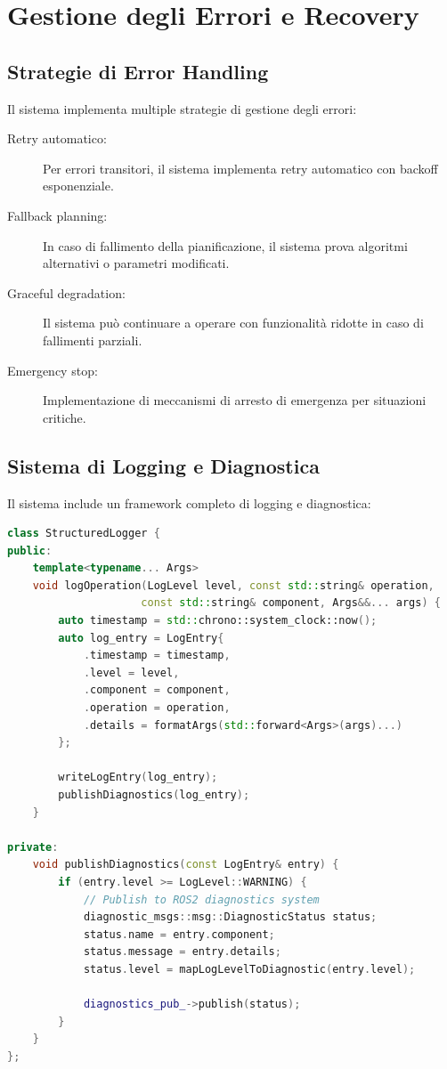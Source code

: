 \documentclass[12pt,a4paper,twoside,openright]{book}
\begin{document}
\section{Gestione degli Errori e Recovery}

\subsection{Strategie di Error Handling}

Il sistema implementa multiple strategie di gestione degli errori:

\begin{description}
    \item[Retry automatico:] Per errori transitori, il sistema implementa retry automatico con backoff esponenziale.
    
    \item[Fallback planning:] In caso di fallimento della pianificazione, il sistema prova algoritmi alternativi o parametri modificati.
    
    \item[Graceful degradation:] Il sistema può continuare a operare con funzionalità ridotte in caso di fallimenti parziali.
    
    \item[Emergency stop:] Implementazione di meccanismi di arresto di emergenza per situazioni critiche.
\end{description}

\subsection{Sistema di Logging e Diagnostica}

Il sistema include un framework completo di logging e diagnostica:

\begin{lstlisting}[language=C++, caption={Sistema di logging strutturato}]
class StructuredLogger {
public:
    template<typename... Args>
    void logOperation(LogLevel level, const std::string& operation, 
                     const std::string& component, Args&&... args) {
        auto timestamp = std::chrono::system_clock::now();
        auto log_entry = LogEntry{
            .timestamp = timestamp,
            .level = level,
            .component = component,
            .operation = operation,
            .details = formatArgs(std::forward<Args>(args)...)
        };
        
        writeLogEntry(log_entry);
        publishDiagnostics(log_entry);
    }
    
private:
    void publishDiagnostics(const LogEntry& entry) {
        if (entry.level >= LogLevel::WARNING) {
            // Publish to ROS2 diagnostics system
            diagnostic_msgs::msg::DiagnosticStatus status;
            status.name = entry.component;
            status.message = entry.details;
            status.level = mapLogLevelToDiagnostic(entry.level);
            
            diagnostics_pub_->publish(status);
        }
    }
};
\end{lstlisting}
\end{document}
